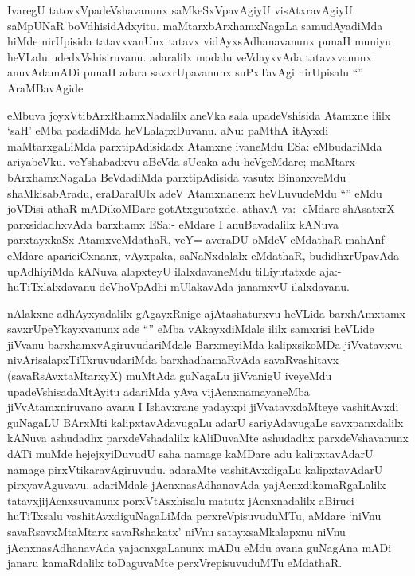 \begin{artha}
IvaregU tatovxVpadeVshavanunx saMkeSxVpavAgiyU visAtxravAgiyU saMpUNaR boVdhisidAdxyitu. maMtarxbArxhamxNagaLa samudAyadiMda hiMde nirUpisida tatavxvanUnx tatavx vidAyxsAdhanavanunx punaH muniyu heVLalu udedxVshisiruvanu. adaralilx modalu veVdayxvAda tatavxvanunx anuvAdamADi punaH adara savxrUpavanunx suPxTavAgi nirUpisalu ``\stext'' AraMBavAgide
\end{artha}


\begin{artha}
eMbuva joyxVtibArxRhamxNadalilx aneVka sala upadeVshisida Atamxne ililx `saH' eMba padadiMda heVLalapxDuvanu. aNu: paMthA itAyxdi maMtarxgaLiMda parxtipAdisidadx Atamxne ivaneMdu ESa: eMbudariMda ariyabeVku. veYshabadxvu aBeVda sUcaka adu heVgeMdare; maMtarx bArxhamxNagaLa BeVdadiMda parxtipAdisida vasutx BinanxveMdu shaMkisabAradu, eraDaralUlx adeV Atamxnanenx heVLuvudeMdu ``\stext'' eMdu joVDisi athaR mADikoMDare gotAtxgutatxde. athavA va:- eMdare shAsatxrX parxsidadhxvAda barxhamx ESa:- eMdare I anuBavadalilx kANuva parxtayxkaSx AtamxveMdathaR, veY= averaDU oMdeV eMdathaR mahAnf eMdare apariciCxnanx, vAyxpaka, saNaNxdalalx eMdathaR, budidhxrUpavAda upAdhiyiMda kANuva alapxteyU ilalxdavaneMdu tiLiyutatxde aja:- huTiTxlalxdavanu deVhoVpAdhi mUlakavAda janamxvU ilalxdavanu.
\end{artha}

\begin{artha}
nAlakxne adhAyxyadalilx gAgayxRnige ajAtashaturxvu heVLida barxhAmxtamx savxrUpeYkayxvanunx ade ``\stext'' eMba vAkayxdiMdale ililx samxrisi heVLide jiVvanu barxhamxvAgiruvudariMdale BarxmeyiMda kalipxsikoMDa jiVvatavxvu nivArisalapxTiTxruvudariMda barxhadhamaRvAda savaRvashitavx (savaRsAvxtaMtarxyX) muMtAda guNagaLu jiVvanigU iveyeMdu upadeVshisadaMtAyitu adariMda yAva vijAcnxnamayaneMba jiVvAtamxniruvano avanu I Ishavxrane yadayxpi jiVvatavxdaMteye vashitAvxdi guNagaLU BArxMti kalipxtavAdavugaLu adarU sariyAdavugaLe savxpanxdalilx kANuva ashudadhx parxdeVshadalilx kAliDuvaMte ashudadhx parxdeVshavanunx dATi muMde hejejxyiDuvudU saha namage kaMDare adu kalipxtavAdarU namage pirxVtikaravAgiruvudu. adaraMte vashitAvxdigaLu kalipxtavAdarU pirxyavAguvavu. adariMdale jAcnxnasAdhanavAda yajAcnxdikamaRgaLalilx tatavxjijAcnxsuvanunx porxVtAsxhisalu matutx jAcnxnadalilx aBiruci huTiTxsalu vashitAvxdiguNagaLiMda perxreVpisuvuduMTu, aMdare `niVnu savaRsavxMtaMtarx savaRshakatx' niVnu satayxsaMkalapxnu niVnu jAcnxnasAdhanavAda yajacnxgaLanunx mADu eMdu avana guNagAna mADi janaru kamaRdalilx toDaguvaMte perxVrepisuvuduMTu eMdathaR.
\end{artha}

